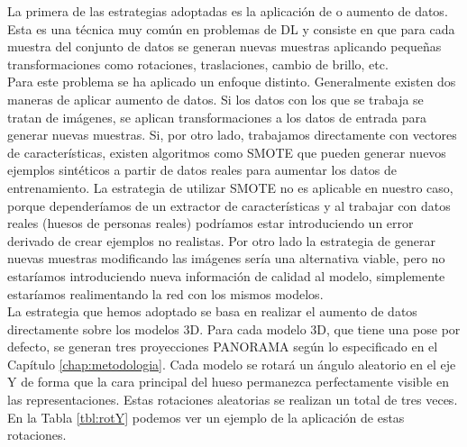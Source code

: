 La primera de las estrategias adoptadas es la aplicación de  o aumento de datos. Esta es una técnica muy común en problemas de DL y consiste en que para cada muestra del conjunto de datos se generan nuevas muestras aplicando pequeñas transformaciones como rotaciones, traslaciones, cambio de brillo, etc.\\

Para este problema se ha aplicado un enfoque distinto. Generalmente existen dos maneras de aplicar aumento de datos. Si los datos con los que se trabaja se tratan de imágenes, se aplican transformaciones a los datos de entrada para generar nuevas muestras. Si, por otro lado, trabajamos directamente con vectores de características, existen algoritmos como SMOTE \cite{chawla2002smote} que pueden generar nuevos ejemplos sintéticos a partir de datos reales para aumentar los datos de entrenamiento. La estrategia de utilizar SMOTE no es aplicable en nuestro caso, porque dependeríamos de un extractor de características y al trabajar con datos reales (huesos de personas reales) podríamos estar introduciendo un error derivado de crear ejemplos no realistas. Por otro lado la estrategia de generar nuevas muestras modificando las imágenes sería una alternativa viable, pero no estaríamos introduciendo nueva información de calidad al modelo, simplemente estaríamos realimentando la red con los mismos modelos.\\
\newpage
La estrategia que hemos adoptado se basa en realizar el aumento de datos directamente sobre los modelos 3D. Para cada modelo 3D, que tiene una pose por defecto, se generan tres proyecciones PANORAMA según lo especificado en el Capítulo \ref{chap:metodologia}. Cada modelo se rotará un ángulo aleatorio en el eje Y de forma que la cara principal del hueso permanezca perfectamente visible en las representaciones. Estas rotaciones aleatorias se realizan un total de tres veces. En la Tabla \ref{tbl:rotY} podemos ver un ejemplo de la aplicación de estas rotaciones.

